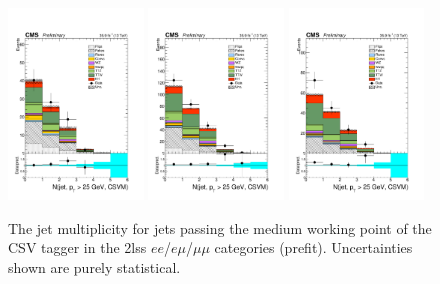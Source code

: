 \begin{figure}[htp]
\centering
\includegraphics[width=0.32\textwidth]{ch5_figs/nJets_CSVM_ttH_ee_stackPlot_SR.pdf}
\includegraphics[width=0.32\textwidth]{ch5_figs/nJets_CSVM_ttH_em_stackPlot_SR.pdf}
\includegraphics[width=0.32\textwidth]{ch5_figs/nJets_CSVM_ttH_mm_stackPlot_SR.pdf} \\
\caption[Data/MC comparison of the CSVM jet multiplicity in the signal region]{The jet multiplicity for jets passing the medium working point of the CSV tagger in the 2lss $ee$/$e\mu$/$\mu\mu$ categories (prefit). Uncertainties shown are purely statistical.}
\label{fig:sr_njets_csvm}
\end{figure}

